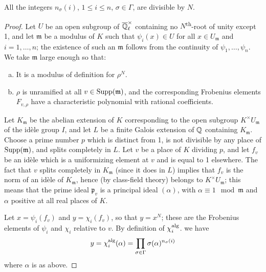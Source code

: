 \begin{lem}
	All the integers $n_\sigma(i)$, $1 \le i \le n$, $\sigma \in \Gamma$,
	are divisible by $N$.
\end{lem}
\begin{proof}
	Let $U$ be an open subgroup of $\overline{\mathbb{Q}}_\ell^\times$ containing no
	$N$\textsuperscript{th}-root of unity except 1, and let $\mathfrak{m}$
	be a modulus of $K$ such that $\psi_i(x) \in U$ for all $x \in
	U_{\mathfrak{m}}$ and $i = 1, \dots, n$; the existence of such an
	$\mathfrak{m}$ follows from the continuity of $\psi_1, \dots, \psi_n$.
	We take $\mathfrak{m}$ large enough so that:
	\begin{enumerate}[a)]
	\item It is a modulus of definition for $\rho^N$.
	\item $\rho$ is unramified at all $v \in \operatorname{Supp}(\mathfrak{m})$, and the
		corresponding Frobenius elements $F_{v, \rho}$ have a
		characteristic polynomial with
		\dpage
		rational coefficients.
	\end{enumerate}
	Let $K_{\mathfrak{m}}$ be the abelian extension of $K$ corresponding to
	the open subgroup $K^\times U_{\mathfrak{m}}$ of the idèle group $I$,
	and let $L$ be a finite Galois extension of $\mathbb{Q}$ containing
	$K_{\mathfrak{m}}$. Choose a prime number $p$ which is distinct from 1,
	is not divisible by any place of $\operatorname{Supp}(\mathfrak{m})$, and splits
	completely in $L$. Let $v$ be a place of $K$ dividing $p$, and let
	$f_v$ be an idèle which is a uniformizing element at $v$ and is equal
	to 1 elsewhere. The fact that $v$ splits completely in
	$K_{\mathfrak{m}}$ (since it does in $L$) implies that $f_v$ is the
	norm of an idèle of $K_{\mathfrak{m}}$, hence (by class-field theory)
	belongs to $K^\times U_{\mathfrak{m}}$; this means that the prime ideal
	$\mathfrak{p}_v$ is a principal ideal $(\alpha)$, with $\alpha \equiv 1
	\mod{\mathfrak{m}}$ and $\alpha$ positive at all real places of $K$.

	Let $x = \psi_i(f_v)$ and $y = \chi_i(f_v)$, so that $y = x^N$; these
	are the Frobenius elements of $\psi_i$ and $\chi_i$ relative to $v$. By
	definition of $\chi_i^{\rm alg}$. we have
	\[
		y = \chi_i^{\rm alg}(\alpha) = \prod_{\sigma \in \Gamma}
		\sigma(\alpha)^{n_\sigma(i)}
	\]
	where $\alpha$ is as above.


\end{proof}
